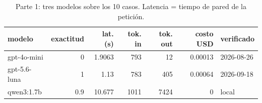\begin{table}[H]\centering\caption{Parte 1: tres modelos sobre los 10 casos. Latencia = tiempo de pared de la petición.}\label{tab:p1}
{\footnotesize\setlength{\tabcolsep}{3.5pt}
\begin{tabular}{lrrrrrl}
\hline
modelo & exactitud & lat. (s) & tok. in & tok. out & costo USD & verificado \\
\hline
gpt-4o-mini & 0 & 1.9063 & 793 & 12 & 0.00013 & 2026-08-26 \\
gpt-5.6-luna & 1 & 1.13 & 783 & 405 & 0.00064 & 2026-09-18 \\
qwen3:1.7b & 0.9 & 10.677 & 1011 & 7424 & 0 & local \\
\hline
\end{tabular}
}\end{table}
